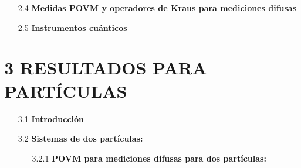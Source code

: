 \documentclass[12pt,oneside]{book}\raggedbottom{} %
\begin{document}
\begin{sloppypar}
{{\begin{itemize}
\begin{itemize}
\end{itemize}




  \item[2.4]\textbf{Medidas POVM y operadores de Kraus para mediciones difusas}

  
  
  \item[2.5]  \textbf{Instrumentos cuánticos} 
\end{itemize}


\section*{3 RESULTADOS PARA \texorpdfstring{}{N}  PARTÍCULAS}
\begin{itemize}

  \item[3.1] \textbf{Introducción}   
  
  \item[3.2]  \textbf{Sistemas de dos partículas:}

  \begin{itemize}
    \item[3.2.1] \textbf{POVM para mediciones difusas para dos partículas:}\label{Sec_POVM_para_mediciones_difusas} 
    

\end{itemize}
\end{itemize}}}
\end{sloppypar}
\end{document}
